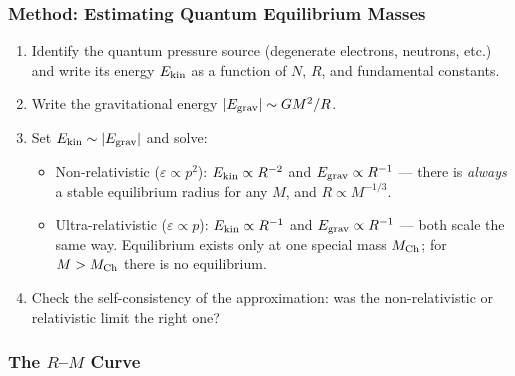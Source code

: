 
\subsubsection*{Method: Estimating Quantum Equilibrium Masses}
\begin{enumerate}
    \item Identify the quantum pressure source (degenerate electrons, neutrons,
    etc.) and write its energy $E_{\rm kin}$ as a function of $N$, $R$, and
    fundamental constants.
    \item Write the gravitational energy $|E_{\rm grav}| \sim GM^2/R$.
    \item Set $E_{\rm kin} \sim |E_{\rm grav}|$ and solve:
    \begin{itemize}
        \item Non-relativistic ($\varepsilon \propto p^2$): $E_{\rm kin}\propto
        R^{-2}$ and $E_{\rm grav}\propto R^{-1}$ --- there is \emph{always} a
        stable equilibrium radius for any $M$, and $R\propto M^{-1/3}$.
        \item Ultra-relativistic ($\varepsilon\propto p$): $E_{\rm kin}\propto
        R^{-1}$ and $E_{\rm grav}\propto R^{-1}$ --- both scale the same way.
        Equilibrium exists only at one special mass $M_{\rm Ch}$; for $M>M_{\rm Ch}$
        there is no equilibrium.
    \end{itemize}
    \item Check the self-consistency of the approximation: was the non-relativistic
    or relativistic limit the right one?
\end{enumerate}

\subsubsection*{The $R$--$M$ Curve}

